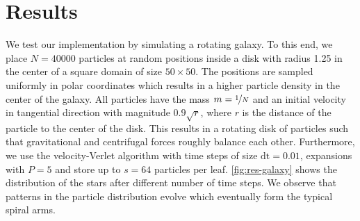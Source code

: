 \section{Results}
\label{results}

We test our implementation by simulating a rotating galaxy.
To this end, we place $N = \num{40000}$ particles at random positions inside a disk with radius \num{1.25} in the center of a square domain of size $50 \times 50$.
The positions are sampled uniformly in polar coordinates which results in a higher particle density in the center of the galaxy.
All particles have the mass $m = \nicefrac 1N$ and an initial velocity in tangential direction with magnitude $0.9 \sqrt{r}$, where $r$ is the distance of the particle to the center of the disk.
This results in a rotating disk of particles such that gravitational and centrifugal forces roughly balance each other.
Furthermore, we use the velocity-Verlet algorithm \cite{groot} with time steps of size $\mathrm{dt} = 0.01$, expansions with $P=5$ and store up to $s = \num{64}$ particles per leaf.
\cref{fig:res-galaxy} shows the distribution of the stars after different number of time steps.
We observe that patterns in the particle distribution evolve which eventually form the typical spiral arms.

